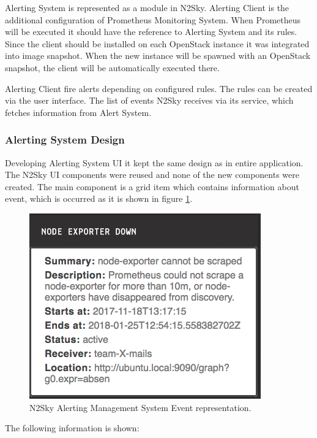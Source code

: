 Alerting System is represented as a module in N2Sky. 
Alerting Client is the additional configuration of Prometheus Monitoring System. When Prometheus will be executed it should have the reference to Alerting System and its rules. 
Since the client should be installed on each OpenStack instance it was integrated into image snapshot. When the new instance will be spawned with an OpenStack snapshot, the client will be automatically executed there.  

Alerting Client fire alerts depending on configured rules. The rules can be created via the user interface. The list of events N2Sky receives via its service, which fetches information from Alert System. 
 
\subsubsection{Alerting System Design}\label{Alerting System Design}

Developing Alerting System UI it kept the same design as in entire application. The N2Sky UI components were reused and none of the new components were created. The main component is a grid item which contains information about event, which is occurred  as it is shown in figure \ref{fig:alert_grid}.

\begin{figure}[htbp]
\begin{center}
  \includegraphics[scale=0.7]{components/3/alerts/alert_grid.png}
  \caption{N2Sky Alerting Management System Event representation.}
  \label{fig:alert_grid}
\end{center}
\end{figure}

The following information is shown:

